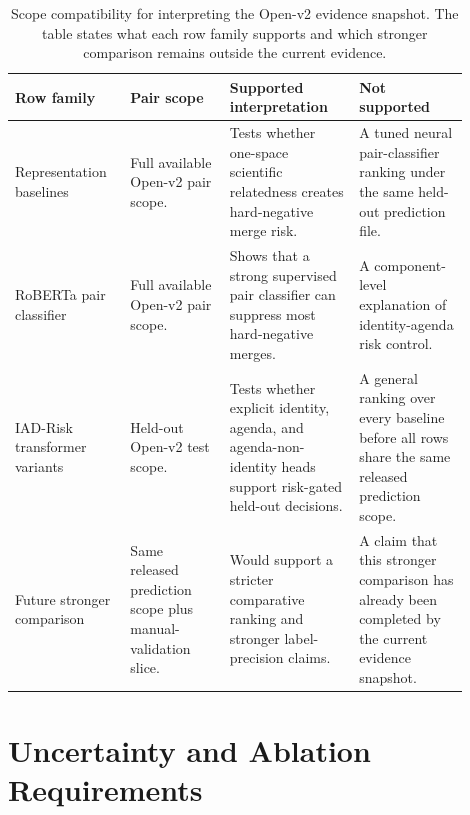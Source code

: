 \documentclass[11pt]{article}
\begin{document}
\begin{table}[H]
\caption{Scope compatibility for interpreting the Open-v2 evidence snapshot. The table states what each row family supports and which stronger comparison remains outside the current evidence.}
\label{tab:scope-compatibility}
\centering
\footnotesize
\setlength{\tabcolsep}{3pt}
\begin{tabular}{L{0.22\linewidth}L{0.20\linewidth}L{0.26\linewidth}L{0.22\linewidth}}
\toprule
Row family & Pair scope & Supported interpretation & Not supported \\
\midrule
Representation baselines & Full available Open-v2 pair scope. & Tests whether one-space scientific relatedness creates hard-negative merge risk. & A tuned neural pair-classifier ranking under the same held-out prediction file. \\
RoBERTa pair classifier & Full available Open-v2 pair scope. & Shows that a strong supervised pair classifier can suppress most hard-negative merges. & A component-level explanation of identity-agenda risk control. \\
IAD-Risk transformer variants & Held-out Open-v2 test scope. & Tests whether explicit identity, agenda, and agenda-non-identity heads support risk-gated held-out decisions. & A general ranking over every baseline before all rows share the same released prediction scope. \\
Future stronger comparison & Same released prediction scope plus manual-validation slice. & Would support a stricter comparative ranking and stronger label-precision claims. & A claim that this stronger comparison has already been completed by the current evidence snapshot. \\
\bottomrule
\end{tabular}
\end{table}

\section{Uncertainty and Ablation Requirements}
\end{document}
